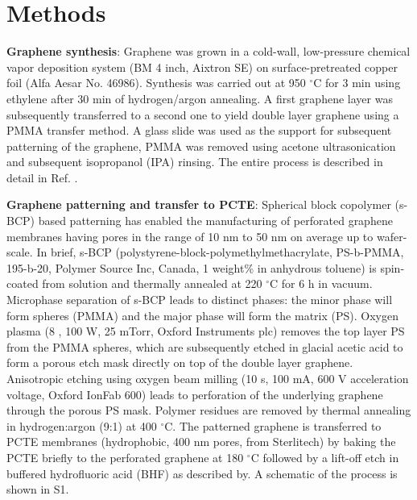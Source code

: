 \section{Methods}
\label{sec:np-methods}

\textbf{Graphene synthesis}: Graphene was grown in a cold-wall,
low-pressure chemical vapor deposition system (BM 4 inch, Aixtron SE)
on surface-pretreated copper foil (Alfa Aesar No. 46986). Synthesis was
carried out at 950 $^{\circ}$C for 3 min using ethylene after 30 min of
hydrogen/argon annealing. A first graphene layer was subsequently
transferred to a second one to yield double layer graphene using a
PMMA transfer method. A glass slide was used as the support for
subsequent patterning of the graphene, PMMA was removed using acetone
ultrasonication and subsequent isopropanol (IPA) rinsing. The entire
process is described in detail in Ref. \cite{Choi_2018_wafer_scale_gr}.

\vspace{1em}
\noindent
\textbf{Graphene patterning and transfer to PCTE}: Spherical block
copolymer (s-BCP) based patterning has enabled the manufacturing of
perforated graphene membranes having pores in the range of 10 nm to 50
nm on average up to wafer-scale\cite{Choi_2018_wafer_scale_gr}. In brief, s-BCP
(polystyrene-block-polymethylmethacrylate, PS-b-PMMA, 195-b-20,
Polymer Source Inc, Canada, 1 weight\% in anhydrous toluene) is
spin-coated from solution and thermally annealed at 220 $^{\circ}$C
for 6 h in vacuum. Microphase separation of s-BCP leads to distinct
phases: the minor phase will form spheres (PMMA) and the major phase
will form the matrix (PS). Oxygen plasma (8 , 100 W, 25 mTorr, Oxford
Instruments plc) removes the top layer PS from the PMMA spheres, which
are subsequently etched in glacial acetic acid to form a porous
etch mask directly on top of the double layer graphene. Anisotropic
etching using oxygen beam milling (10 s, 100 mA, 600 V acceleration
voltage, Oxford IonFab 600) leads to perforation of the underlying
graphene through the porous PS mask. Polymer residues are removed by
thermal annealing in hydrogen:argon (9:1) at 400 $^{\circ}$C. The
patterned graphene is transferred to PCTE membranes (hydrophobic, 400
nm pores, from Sterlitech) by baking the PCTE briefly to the
perforated graphene at 180 $^{\circ}$C followed by a lift-off etch in
buffered hydrofluoric acid (BHF) as described by\cite{Choi_2018_wafer_scale_gr}. A
schematic of the process is shown in  S1.

